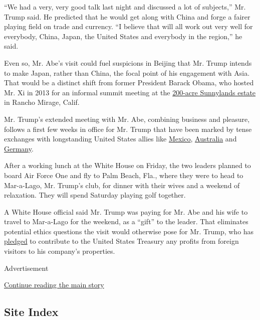 ``We had a very, very good talk last night and discussed a lot of
subjects,'' Mr. Trump said. He predicted that he would get along with
China and forge a fairer playing field on trade and currency. ``I
believe that will all work out very well for everybody, China, Japan,
the United States and everybody in the region,'' he said.

Even so, Mr. Abe's visit could fuel suspicions in Beijing that Mr. Trump
intends to make Japan, rather than China, the focal point of his
engagement with Asia. That would be a distinct shift from former
President Barack Obama, who hosted Mr. Xi in 2013 for an informal summit
meeting at the
\href{http://www.nytimes.com/2013/06/08/us/politics/an-expansive-setting-for-obamas-talks-with-chinas-leader.html}{200-acre
Sunnylands estate} in Rancho Mirage, Calif.

Mr. Trump's extended meeting with Mr. Abe, combining business and
pleasure, follows a first few weeks in office for Mr. Trump that have
been marked by tense exchanges with longstanding United States allies
like
\href{https://www.nytimes.com/2017/01/26/world/americas/mexico-pena-nieto-donald-trump.html}{Mexico},
\href{https://www.nytimes.com/2017/02/02/world/australia/donald-trump-malcolm-turnbull-refugees.html}{Australia}
and
\href{https://www.nytimes.com/2017/02/06/world/europe/germany-prepares-for-turbulence-in-the-trump-era.html}{Germany}.

After a working lunch at the White House on Friday, the two leaders
planned to board Air Force One and fly to Palm Beach, Fla., where they
were to head to Mar-a-Lago, Mr. Trump's club, for dinner with their
wives and a weekend of relaxation. They will spend Saturday playing golf
together.

A White House official said Mr. Trump was paying for Mr. Abe and his
wife to travel to Mar-a-Lago for the weekend, as a ``gift'' to the
leader. That eliminates potential ethics questions the visit would
otherwise pose for Mr. Trump, who has
\href{http://www.nytimes.com/2017/01/11/us/politics/trump-organization-business-conflicts.html}{pledged}
to contribute to the United States Treasury any profits from foreign
visitors to his company's properties.

Advertisement

\protect\hyperlink{after-bottom}{Continue reading the main story}

\hypertarget{site-index}{%
\subsection{Site Index}\label{site-index}}

